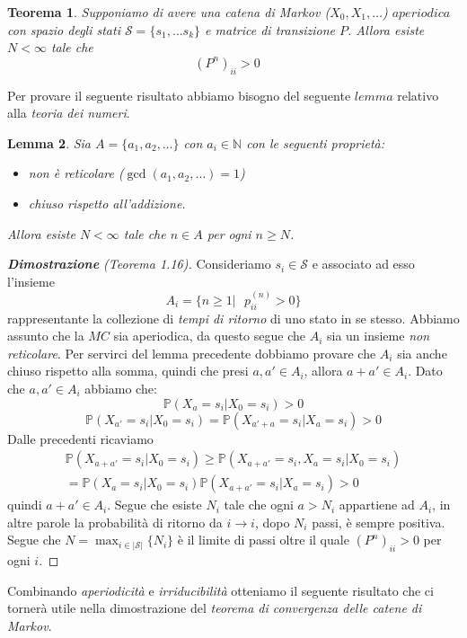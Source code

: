 \documentclass{article}
\newtheorem{theorem}{Teorema}[section]
\newtheorem{lemma}[theorem]{Lemma}
\theoremstyle{definition}
\theoremstyle{definition}
\theoremstyle{remark}
\begin{document}
\begin{theorem}
    Supponiamo di avere una catena di Markov ($X_0,X_1,\dots$)  $aperiodica$ con spazio degli stati $\mathcal{S} = \{s_1,\dots s_k\}$ e matrice di transizione $P$. Allora esiste $N<\infty$ tale che
    $$(P^n)_{ii}>0\quad $$
\end{theorem}
Per provare il seguente risultato abbiamo bisogno del seguente $lemma$ relativo alla \textit{teoria dei numeri}.
\begin{lemma}
    Sia $A=\{a_1,a_2,\dots\}$ con $a_i\in\mathbb{N}$ con le seguenti proprietà:
    \begin{itemize}
        \item [-] non è reticolare ($\gcd(a_1,a_2,\dots) = 1$)
        \item [-] chiuso rispetto all'addizione.
    \end{itemize}
    Allora esiste $N<\infty$ tale che $n\in A$  per ogni  $n\ge N$.
\end{lemma}
\begin{proof}[\textbf{Dimostrazione} (Teorema 1.16)] Consideriamo $s_i\in\mathcal{S}$ e associato ad esso l'insieme $$A_i =\{n\ge 1|\text{ } p^{(n)}_{ii}>0\}$$
    rappresentante la collezione di \textit{tempi di ritorno} di uno stato in se stesso. Abbiamo assunto che la $MC$ sia aperiodica, da questo segue che $A_i$ sia un
    insieme \textit{non reticolare}. Per servirci del lemma precedente dobbiamo provare che $A_i$ sia anche chiuso rispetto alla somma, quindi che presi $a,a'\in A_i$,
    allora $a+a'\in A_i$. Dato che $a,a' \in A_i$ abbiamo che: $$\mathbb{P}(X_a =s_i | X_0 =s_i)>0$$
    $$\mathbb{P}(X_{a'}= s_i|X_0 = s_i) = \mathbb{P}(X_{a'+a}= s_i| X_a = s_i)>0$$
    Dalle precedenti ricaviamo
    \begin{align*}
        \mathbb{P}(X_{a+a'} = s_i| X_0 = s_i) \ge \mathbb{P}(X_{a+a'}= s_i, X_a =s_i| X_0 = s_i) \\
        =\mathbb{P}(X_{a} = s_i|X_0 = s_i) \mathbb{P}(X_{a+a'} = s_i | X_a = s_i) > 0
    \end{align*}
    quindi $a+a'\in A_i$. Segue che esiste $N_i$ tale che ogni $a>N_i$ appartiene ad $A_i$, in altre parole la probabilità di ritorno da $i\to i$, dopo $N_i$ passi, è sempre positiva. Segue
    che $N = \max_{i\in |\mathcal{S}|}\{N_i\}$ è il limite di passi oltre il quale $(P^n)_{ii} > 0 $ per ogni $i$.
\end{proof}
Combinando \textit{aperiodicità} e \textit{irriducibilità} otteniamo il seguente risultato che ci tornerà utile nella dimostrazione del \textit{teorema di convergenza delle catene di Markov}.
\end{document}
